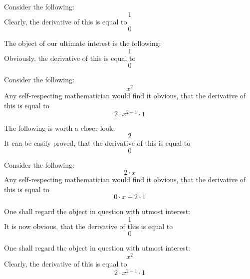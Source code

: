 \documentclass{article}
\begin{document}
Consider the following:
\begin{equation}
1 
\end{equation}
Clearly, the derivative of this is equal to
\begin{equation}
0 
\end{equation}

The object of our ultimate interest is the following:
\begin{equation}
1 
\end{equation}
Obviously, the derivative of this is equal to
\begin{equation}
0 
\end{equation}

Consider the following:
\begin{equation}
x ^{2 } 
\end{equation}
Any self-respecting mathematician would find it obvious, that the derivative of this is equal to
\begin{equation}
2 \cdot x ^{2 - 1 } \cdot 1 
\end{equation}

The following is worth a closer look:
\begin{equation}
2 
\end{equation}
It can be easily proved, that the derivative of this is equal to
\begin{equation}
0 
\end{equation}

Consider the following:
\begin{equation}
2 \cdot x 
\end{equation}
Any self-respecting mathematician would find it obvious, that the derivative of this is equal to
\begin{equation}
0 \cdot x + 2 \cdot 1 
\end{equation}

One shall regard the object in question with utmost interest:
\begin{equation}
1 
\end{equation}
It is now obvious, that the derivative of this is equal to
\begin{equation}
0 
\end{equation}

One shall regard the object in question with utmost interest:
\begin{equation}
x ^{2 } 
\end{equation}
Clearly, the derivative of this is equal to
\begin{equation}
2 \cdot x ^{2 - 1 } \cdot 1 
\end{equation}
\end{document}
